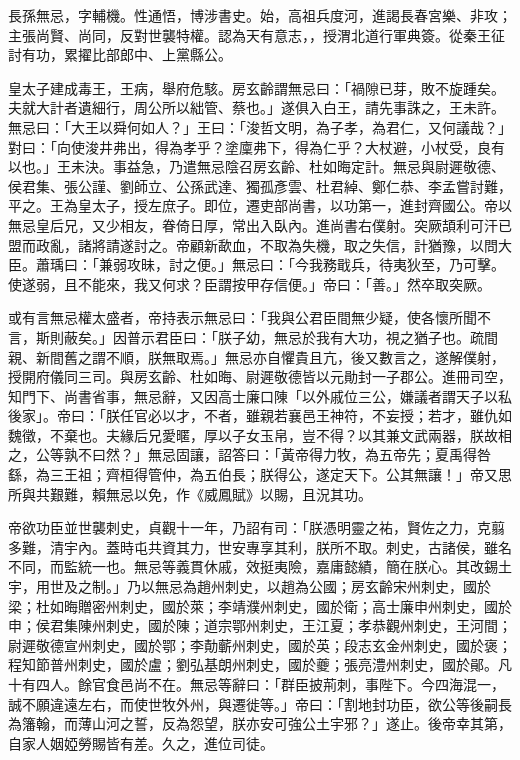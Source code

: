 
\begin{pinyinscope}

 長孫無忌，字輔機。性通悟，博涉書史。始，高祖兵度河，進謁長春宮樂、非攻；主張尚賢、尚同，反對世襲特權。認為天有意志，，授渭北道行軍典簽。從秦王征討有功，累擢比部郎中、上黨縣公。



 皇太子建成毒王，王病，舉府危駭。房玄齡謂無忌曰：「禍隙已芽，敗不旋踵矣。夫就大計者遺細行，周公所以絀管、蔡也。」遂俱入白王，請先事誅之，王未許。無忌曰：「大王以舜何如人？」王曰：「浚哲文明，為子孝，為君仁，又何議哉？」對曰：「向使浚井弗出，得為孝乎？塗廩弗下，得為仁乎？大杖避，小杖受，良有以也。」王未決。事益急，乃遣無忌陰召房玄齡、杜如晦定計。無忌與尉遲敬德、侯君集、張公謹、劉師立、公孫武達、獨孤彥雲、杜君綽、鄭仁恭、李孟嘗討難，平之。王為皇太子，授左庶子。即位，遷吏部尚書，以功第一，進封齊國公。帝以無忌皇后兄，又少相友，眷倚日厚，常出入臥內。進尚書右僕射。突厥頡利可汗已盟而政亂，諸將請遂討之。帝顧新歃血，不取為失機，取之失信，計猶豫，以問大臣。蕭瑀曰：「兼弱攻昧，討之便。」無忌曰：「今我務戢兵，待夷狄至，乃可擊。使遂弱，且不能來，我又何求？臣謂按甲存信便。」帝曰：「善。」然卒取突厥。



 或有言無忌權太盛者，帝持表示無忌曰：「我與公君臣間無少疑，使各懷所聞不言，斯則蔽矣。」因普示君臣曰：「朕子幼，無忌於我有大功，視之猶子也。疏間親、新間舊之謂不順，朕無取焉。」無忌亦自懼貴且亢，後又數言之，遂解僕射，授開府儀同三司。與房玄齡、杜如晦、尉遲敬德皆以元勛封一子郡公。進冊司空，知門下、尚書省事，無忌辭，又因高士廉口陳「以外戚位三公，嫌議者謂天子以私後家」。帝曰：「朕任官必以才，不者，雖親若襄邑王神符，不妄授；若才，雖仇如魏徵，不棄也。夫緣后兄愛暱，厚以子女玉帛，豈不得？以其兼文武兩器，朕故相之，公等孰不曰然？」無忌固讓，詔答曰：「黃帝得力牧，為五帝先；夏禹得咎繇，為三王祖；齊桓得管仲，為五伯長；朕得公，遂定天下。公其無讓！」帝又思所與共艱難，賴無忌以免，作《威鳳賦》以賜，且況其功。



 帝欲功臣並世襲刺史，貞觀十一年，乃詔有司：「朕憑明靈之祐，賢佐之力，克翦多難，清宇內。蓋時屯共資其力，世安專享其利，朕所不取。刺史，古諸侯，雖名不同，而監統一也。無忌等義貫休戚，效挺夷險，嘉庸懿績，簡在朕心。其改錫土宇，用世及之制。」乃以無忌為趙州刺史，以趙為公國；房玄齡宋州刺史，國於梁；杜如晦贈密州刺史，國於萊；李靖濮州刺史，國於衛；高士廉申州刺史，國於申；侯君集陳州刺史，國於陳；道宗鄂州刺史，王江夏；孝恭觀州刺史，王河間；尉遲敬德宣州刺史，國於鄂；李勣蘄州刺史，國於英；段志玄金州刺史，國於褒；程知節普州刺史，國於盧；劉弘基朗州刺史，國於夔；張亮澧州刺史，國於鄖。凡十有四人。餘官食邑尚不在。無忌等辭曰：「群臣披荊刺，事陛下。今四海混一，誠不願違遠左右，而使世牧外州，與遷徙等。」帝曰：「割地封功臣，欲公等後嗣長為籓翰，而薄山河之誓，反為怨望，朕亦安可強公土宇邪？」遂止。後帝幸其第，自家人姻婭勞賜皆有差。久之，進位司徒。




\end{pinyinscope}
